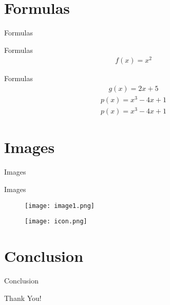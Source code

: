 \documentclass{beamer}
\begin{document}
\section{Formulas}
\begin{frame}
\centering
\Huge{Formulas}
\end{frame}
\begin{frame}{Formulas}
\begin{align*}f(x) = x^2\end{align*}\end{frame}
\begin{frame}{Formulas}
\begin{align*}g(x) = 2x + 5\end{align*}\begin{align*}p(x) = x^3 - 4x + 1\end{align*}\begin{align*}p(x) = x^3 - 4x + 1\end{align*}\end{frame}
\section{Images}
\begin{frame}
\centering
\Huge{Images}
\end{frame}
\begin{frame}{Images}
\begin{figure}[h]\centering\texttt{[image: image1.png]}\end{figure}\begin{figure}[h]\centering\texttt{[image: icon.png]}\end{figure}\end{frame}
\section{Conclusion}
\begin{frame}
\centering
\Huge{Conclusion}
\end{frame}
\begin{frame}
\centering
\Huge{Thank You!}
\end{frame}
\end{document}
